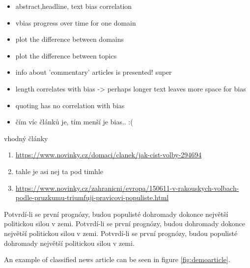 \begin{itemize}
    \item abstract,headline, text bias correlation
    \item vbias progress over time for one domain
    \item plot the difference between domains
    \item plot the difference between topics
    \item info about 'commentary' articles is presented! super
    \item length correlates with bias -> perhaps longer text leaves more space for bias
    \item quoting has no correlation with bias
    \item čím víc článků je, tím menší je bias.. :(
\end{itemize}

vhodný články
\begin{enumerate}
    \item \url{https://www.novinky.cz/domaci/clanek/jak-cist-volby-294694}
    \item tahle je asi nej ta pod timhle
    \item \url{https://www.novinky.cz/zahranicni/evropa/150611-v-rakouskych-volbach-podle-pruzkumu-triumfuji-pravicovi-populiste.html}
\end{enumerate}

 Potvrdí-li se první prognózy, budou populisté dohromady dokonce největší politickou silou v zemi.
 Potvrdí-li se první prognózy, budou dohromady dokonce největší politickou silou v zemi.
 Potvrdí-li se první prognózy, budou populisté dohromady největší politickou silou v zemi.

An example of classified news article can be seen in figure \ref{fig:demoarticle}.

